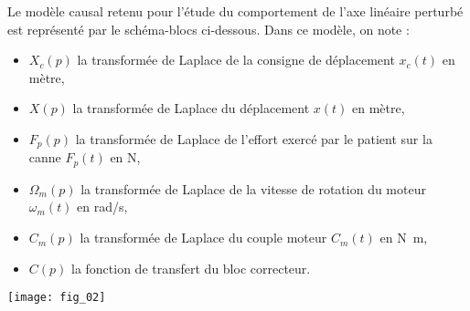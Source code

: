 Le modèle causal retenu pour l'étude du comportement de l'axe linéaire perturbé est représenté par le schéma-blocs ci-dessous. Dans ce modèle, on note :
\begin{itemize}
\item $X_c(p)$ la transformée de Laplace de la consigne de déplacement  $x_c(t)$ en mètre,
\item $X(p)$ la transformée de Laplace du déplacement $x(t)$ en mètre,
\item $F_p(p)$ la transformée de Laplace de   l'effort exercé par le patient sur la canne $F_p(t)$ en N,
\item $\Omega_m(p)$ la transformée de Laplace de la vitesse de rotation du moteur $\omega_m(t)$ en rad/s,
\item $C_m(p)$ la transformée de Laplace du couple moteur $C_m(t)$ en \si{N.m},
\item $C(p)$ la fonction de transfert du bloc correcteur.
\end{itemize}
\begin{center}
\texttt{[image: fig\_02]}
\end{center}
\fi
%
